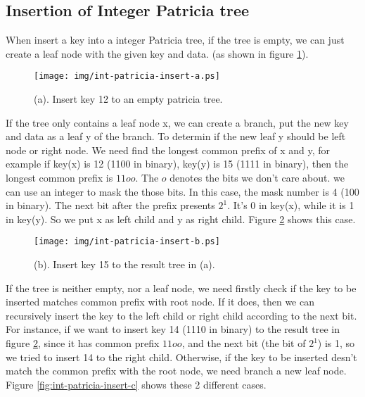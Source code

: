 \documentclass{article}
\begin{document}
\subsection{Insertion of Integer Patricia tree}
When insert a key into a integer Patricia tree, if the tree is empty,
we can just create a leaf node with the given key and data. (as shown
in figure \ref{fig:int-patricia-insert-a}).

\begin{figure}[htbp]
       \begin{center}
	\texttt{[image: img/int-patricia-insert-a.ps]}
        \caption{(a). Insert key 12 to an empty patricia tree.}
        \label{fig:int-patricia-insert-a}
       \end{center}
\end{figure}

If the tree only contains a leaf node x, we can create a branch, put the new
key and data as a leaf y of the branch. To determin if the new leaf y
should be left node or right node. We need find the longest common prefix
of x and y, for example if key(x) is 12 (1100 in binary), key(y) is 15
(1111 in binary), then the longest common prefix is $11oo$. The $o$
denotes the bits we don't care about. we can use an integer to mask
the those bits. In this case, the mask number is 4 (100 in binary).
The next bit after the prefix presents $2^1$. It's 0 in key(x), while
it is 1 in key(y). So we put x as left child and y as right
child. Figure \ref{fig:int-patricia-insert-b} shows this case.

\begin{figure}[htbp]
       \begin{center}
	\texttt{[image: img/int-patricia-insert-b.ps]}
        \caption{(b). Insert key 15 to the result tree in (a).}
        \label{fig:int-patricia-insert-b}
       \end{center}
\end{figure}

If the tree is neither empty, nor a leaf node, we need firstly check
if the key to be inserted matches common prefix with root node. If it
does, then we can recursively insert the key to the left child or right child
according to the next bit. For instance, if we want to
insert key 14 (1110 in binary) to the result tree in figure 
\ref{fig:int-patricia-insert-b}, since it has common prefix $11oo$,
and the next bit (the bit of $2^1$) is 1, so we tried to insert 14 to
the right child. Otherwise, if the key to be inserted desn't match the
common prefix with the root node, we need branch a new leaf
node. Figure \ref{fig:int-patricia-insert-c} shows these 2 different cases.
\end{document}
